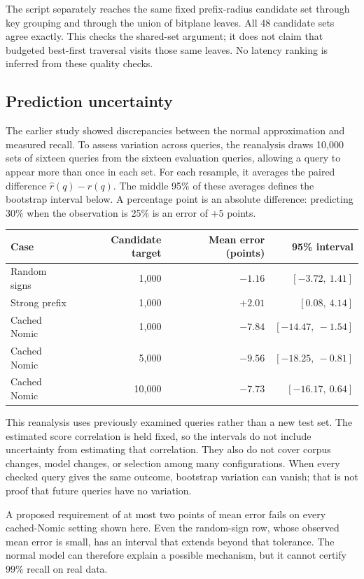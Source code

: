 The script separately reaches the same fixed prefix-radius candidate set through key grouping
and through the union of bitplane leaves. All 48 candidate sets agree exactly. This checks the
shared-set argument; it does not claim that budgeted best-first traversal visits those same
leaves. No latency ranking is inferred from these quality checks.

\subsection{Prediction uncertainty}
The earlier study showed discrepancies between the normal approximation and measured recall.
To assess variation across queries, the reanalysis draws 10,000 sets of sixteen queries from
the sixteen evaluation queries, allowing a query to appear more than once in each set. For
each resample, it averages the paired difference $\widehat r(q)-r(q)$. The middle 95\% of
these averages defines the bootstrap interval below.
A percentage point is an absolute difference: predicting 30\% when the observation is 25\%
is an error of $+5$ points.

\begin{center}\small
\begin{tabular}{@{}lrrr@{}}
\toprule
Case & Candidate target & Mean error (points) & 95\% interval\\\midrule
Random signs & 1,000 & $-1.16$ & $[-3.72,\ 1.41]$\\
Strong prefix & 1,000 & $+2.01$ & $[0.08,\ 4.14]$\\
Cached Nomic & 1,000 & $-7.84$ & $[-14.47,\ -1.54]$\\
Cached Nomic & 5,000 & $-9.56$ & $[-18.25,\ -0.81]$\\
Cached Nomic & 10,000 & $-7.73$ & $[-16.17,\ 0.64]$\\\bottomrule
\end{tabular}\normalsize
\end{center}
This reanalysis uses previously examined queries rather than a new test set. The estimated score
correlation is held fixed, so the intervals do not include uncertainty from estimating that
correlation. They also do not cover corpus changes, model changes, or selection among many
configurations. When every checked query gives the same outcome, bootstrap variation can
vanish; that is not proof that future queries have no variation.

A proposed requirement of at most two points of mean error fails on every cached-Nomic setting
shown here. Even the random-sign row, whose observed mean error is small, has an interval that
extends beyond that tolerance. The normal model can therefore explain a possible mechanism,
but it cannot certify 99\% recall on real data.

